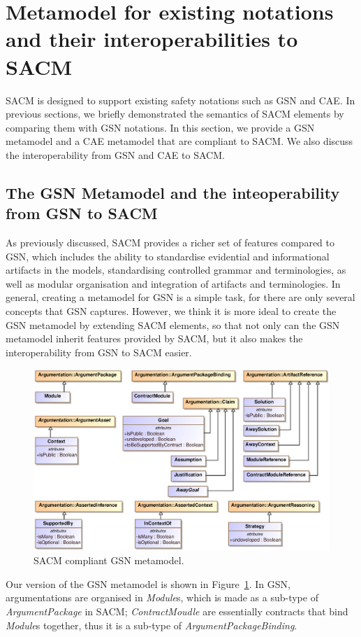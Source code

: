 \section{Metamodel for  existing notations and their interoperabilities to SACM}
\label{sec:mapping}
SACM is designed to support existing safety notations such as GSN and CAE. 
In previous sections, we briefly demonstrated the semantics of SACM elements by comparing them with GSN notations. 
In this section, we provide a GSN metamodel and a CAE metamodel that are compliant to SACM. 
We also discuss the interoperability from GSN and CAE to SACM.

\subsection{The GSN Metamodel and the inteoperability from GSN to SACM}
As previously discussed, SACM provides a richer set of features compared to GSN, which includes the ability to standardise evidential and informational artifacts in the models, standardising controlled grammar and terminologies, as well as modular organisation and integration of artifacts and terminologies. 
In general, creating a metamodel for GSN is a simple task, for there are only several concepts that GSN captures. 
However, we think it is more ideal to create the GSN metamodel by extending SACM elements, so that not only can the GSN metamodel inherit features provided by SACM, but it also makes the interoperability from GSN to SACM easier. 
\begin{figure}
	\centering
	\includegraphics[width=1\linewidth]{GSN.eps}
	\caption{SACM compliant GSN metamodel.}
	\label{fig:gsnMetamodel}
\end{figure}

Our version of the GSN metamodel is shown in Figure~\ref{fig:gsnMetamodel}. 
In GSN, argumentations are organised in \textit{Module}s, which is made as a sub-type of \textit{ArgumentPackage} in SACM; \textit{ContractMoudle} are essentially contracts that bind \textit{Module}s together, thus it is a sub-type of \textit{ArgumentPackageBinding}. 

